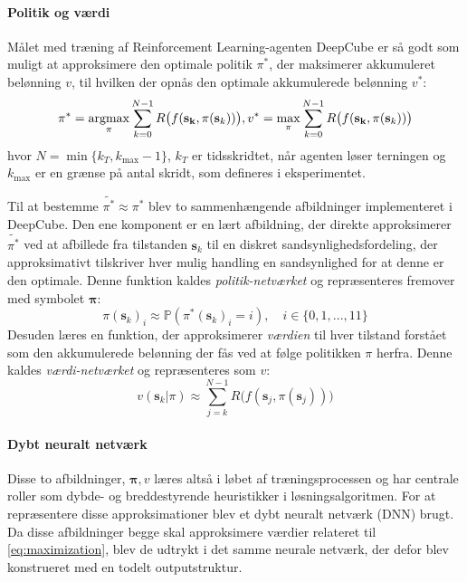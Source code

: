 \documentclass[../main.tex]{subfiles}
\begin{document}
\paragraph{Politik og værdi} Målet med træning af Reinforcement Learning-agenten DeepCube er så godt som muligt at approksimere den optimale politik \(\pi^*\), der maksimerer akkumuleret belønning \(v\), til hvilken der opnås den optimale akkumulerede belønning \(v^*\):
\begin{equation}\label{eq:maximization}
	\pi^* = \operatorname*{argmax}_{\pi}\sum_{k=0}^{N-1} R\big(f(\mathbf{s_k},\pi(\mathbf s_k))\big),
	v^* = \operatorname*{max}_\pi\sum_{k=0}^{N-1} R\big(f(\mathbf{s_k},\pi(\mathbf s_k))\big)
\end{equation}
hvor \(	N = \operatorname{min}\{k_T, k_{\text{max}}-1\}\), \(k_T\) er tidsskridtet, når agenten løser terningen og \(k_{\text{max}}\) er en grænse på antal skridt,  som defineres i eksperimentet. 

Til at bestemme \(\widetilde {\pi ^*} \approx 	\pi^*\) blev to sammenhængende afbildninger implementeret i DeepCube. Den ene komponent er en lært afbildning, der direkte approksimerer \(\widetilde {\pi ^*}\) ved at afbillede fra tilstanden \(\mathbf s_k\) til en diskret sandsynlighedsfordeling, der approksimativt tilskriver hver mulig handling en sandsynlighed for at denne er den optimale. Denne funktion kaldes \textit{politik-netværket} og repræsenteres fremover med symbolet \(\bm \pi\):
\[
\pi(\mathbf s_k)_i \approx \mathbb P (\pi^*(\mathbf s_k)_i = i ),\quad i \in \{0,1, ..., 11\}
\]
Desuden læres en funktion, der approksimerer \textit{værdien} til hver tilstand forstået som den akkumulerede belønning der fås ved at følge politikken \(\pi\) herfra. Denne kaldes \textit{værdi-netværket} og repræsenteres som \(v\):
\[
v(\mathbf s_k| \pi) \approx \sum_{j=k}^{N-1} R\big(f(\mathbf s_j,\pi(\mathbf s_j))\big)
\]
\paragraph{Dybt neuralt netværk} Disse to afbildninger, \(\bm \pi, v\) læres altså i løbet af træningsprocessen og har centrale roller som dybde- og breddestyrende heuristikker i  løsningsalgoritmen. For at repræsentere disse approksimationer blev et dybt neuralt netværk (DNN) brugt. Da disse afbildninger begge skal approksimere værdier relateret til  \eqref{eq:maximization}, blev de udtrykt i det samme neurale netværk, der defor blev konstrueret med en todelt outputstruktur. 
\end{document}
